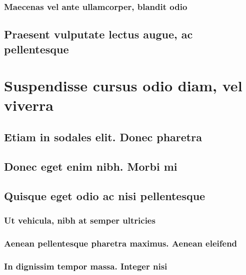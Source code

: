 \documentclass[%
  bachelor,%
  english%
  oneside,%
  debug,%
]{student}
\begin{document}
\lipsum[1-8]

\subsubsection{Maecenas vel ante ullamcorper, blandit odio}

\lipsum[1-8]

\subsection{Praesent vulputate lectus augue, ac pellentesque}

\lipsum[1-8]

\section{Suspendisse cursus odio diam, vel viverra}

\lipsum[1-8]

\subsection{Etiam in sodales elit. Donec pharetra}

\lipsum[1-8]

\subsection{Donec eget enim nibh. Morbi mi}

\lipsum[1-8]

\subsection{Quisque eget odio ac nisi pellentesque}

\lipsum[1-8]

\subsubsection{Ut vehicula, nibh at semper ultricies}

\lipsum[1-8]

\subsubsection{Aenean pellentesque pharetra maximus. Aenean eleifend}

\lipsum[1-8]

\subsubsection{In dignissim tempor massa. Integer nisi}
\end{document}
